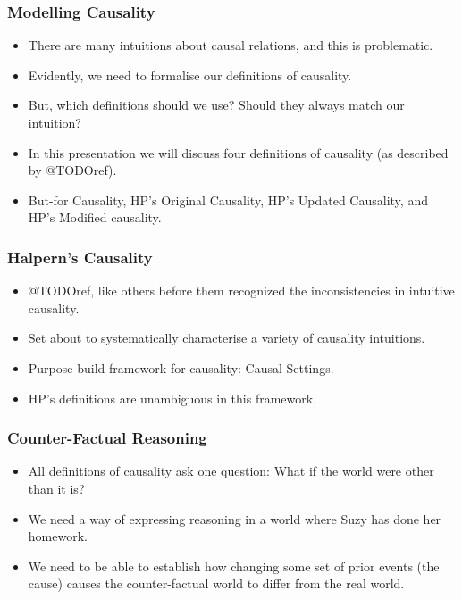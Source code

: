 \documentclass{beamer}
\theoremstyle{plain}
\theoremstyle{definition}
\begin{document}
\begin{frame}
\frametitle{Modelling Causality}
\begin{itemize}
\item There are many intuitions about causal relations, and this is problematic.
\item Evidently, we need to formalise our definitions of causality.
\item But, which definitions should we use? Should they always match our intuition?
\item In this presentation we will discuss four definitions of causality (as described by @TODOref).
\item But-for Causality, HP's Original Causality, HP's Updated Causality, and HP's Modified causality.
\end{itemize}

\end{frame}



\begin{frame}
\frametitle{Halpern's Causality}

\begin{itemize}
\item @TODOref, like others before them recognized the inconsistencies in intuitive causality.
\item Set about to systematically characterise a variety of causality intuitions.
\item Purpose build framework for causality: Causal Settings.
\item HP's definitions are unambiguous in this framework.
\end{itemize}

\end{frame}


\begin{frame}
\frametitle{Counter-Factual Reasoning}
\begin{itemize}
\item All definitions of causality ask one question: What if the world were other than it is?
\item We need a way of expressing reasoning in a world where Suzy has done her homework.
\item We need to be able to establish how changing some set of prior events (the cause) causes the counter-factual world to differ from the real world.
\end{itemize}

\end{frame}
\end{document}
